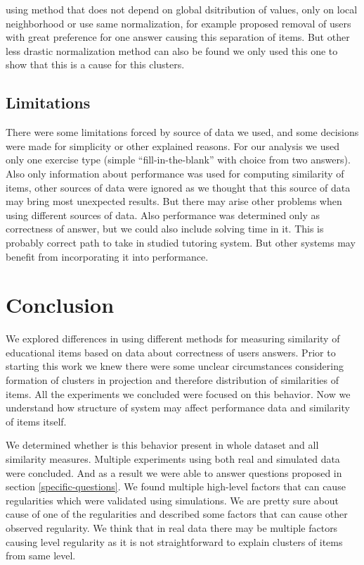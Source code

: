 \documentclass[
  digital, %
  table,   %
  nolof,     %
  nolot,     %
  nocover,
  color
]{fithesis3}
\begin{document}
using method that does not depend on global dsitribution of values, only on local neighborhood
or
use same normalization, for example proposed removal of users with great preference for one answer causing this separation of items. But other less drastic normalization method can also be found we only used this one to show that this is a cause for this clusters.


\section{Limitations}\label{limitations}

There were some limitations forced by source of data we used, and some decisions were made for simplicity or other explained reasons. For our analysis we used only one exercise type (simple ``fill-in-the-blank'' with choice from two answers). Also only information about performance was used for computing similarity of items, other sources of data were ignored as we thought that this source of data may bring most unexpected results. But there may arise other problems when using different sources of data. Also performance was determined only as correctness of answer, but we could also include solving time in it. This is probably correct path to take in studied tutoring system. But other systems may benefit from incorporating it into performance.

\chapter{Conclusion}



We explored differences in using different methods for measuring similarity of educational items based on data about correctness of users answers. Prior to starting this work we knew there were some unclear circumstances considering formation of clusters in projection and therefore distribution of similarities of items. All the experiments we concluded were focused on this behavior. Now we understand how structure of system may affect performance data and similarity of items itself.

We determined whether is this behavior present in whole dataset and all similarity measures. Multiple experiments using both real and simulated data were concluded. And as a result we were able to answer questions proposed in section \ref{specific-questions}. We found multiple high-level factors that can cause regularities which were validated using simulations. We are pretty sure about cause of one of the regularities and described some factors that can cause other observed regularity. We think that in real data there may be multiple factors causing level regularity as it is not straightforward to explain clusters of items from same level.
\end{document}
